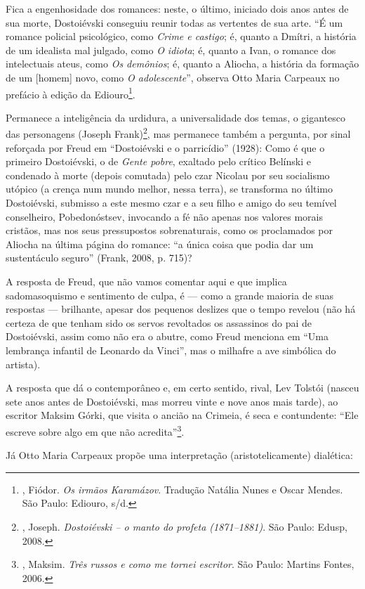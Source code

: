 {{Fica a engenhosidade dos romances: neste, o último, iniciado dois anos antes de sua morte, Dostoiévski conseguiu reunir todas as vertentes de sua arte. ``É um romance policial psicológico, como \emph{Crime e castigo}; é, quanto a Dmítri, a história de um idealista mal julgado, como \emph{O idiota}; é, quanto a Ivan, o romance dos intelectuais ateus, como \emph{Os demônios}; é, quanto a Aliocha, a história da formação de um [homem] novo, como \emph{O adolescente}'', observa Otto Maria Carpeaux no prefácio à edição da Ediouro\footnote{, Fiódor. \emph{Os irmãos Karamázov}. Tradução Natália Nunes e Oscar Mendes. São Paulo: Ediouro, s/d.}.

Permanece a inteligência da urdidura, a universalidade dos temas, o gigantesco das personagens (Joseph Frank)\footnote{, Joseph. \emph{Dostoiévski -- o manto do profeta (1871--1881)}. São Paulo: Edusp, 2008.}, mas permanece também a pergunta, por sinal reforçada por Freud em ``Dostoiévski e o parricídio'' (1928): Como é que o primeiro Dostoiévski, o de \emph{Gente pobre}, exaltado pelo crítico Belínski e condenado à morte (depois comutada) pelo czar Nicolau  por seu socialismo utópico (a crença num mundo melhor, nessa terra), se transforma no último Dostoiévski, submisso a este mesmo czar e a seu filho e amigo do seu temível conselheiro, Pobedonóstsev, invocando a fé não apenas nos valores morais cristãos, mas nos seus pressupostos
sobrenaturais, como os proclamados por Aliocha na última página do romance: ``a única coisa que podia dar um sustentáculo seguro'' (Frank, 2008, p. 715)?

A resposta de Freud, que não vamos comentar aqui e que implica sadomasoquismo e sentimento de culpa, é --- como a grande maioria de suas respostas --- brilhante, apesar dos pequenos deslizes que o tempo revelou (não há certeza de que tenham sido os servos revoltados os assassinos do pai de Dostoiévski, assim como não era o abutre, como Freud menciona em ``Uma lembrança infantil de Leonardo da Vinci'', mas o milhafre a ave simbólica do artista).

A resposta que dá o contemporâneo e, em certo sentido, rival, Lev Tolstói (nasceu sete anos antes de Dostoiévski, mas morreu vinte e nove anos mais tarde), ao escritor Maksim Górki, que visita o ancião na Crimeia, é seca e contundente: ``Ele escreve sobre algo em que não acredita''\footnote{, Maksim. \emph{Três russos e como me tornei escritor}. São Paulo: Martins Fontes, 2006.}.

Já Otto Maria Carpeaux propõe uma interpretação (aristotelicamente) dialética:

}}
